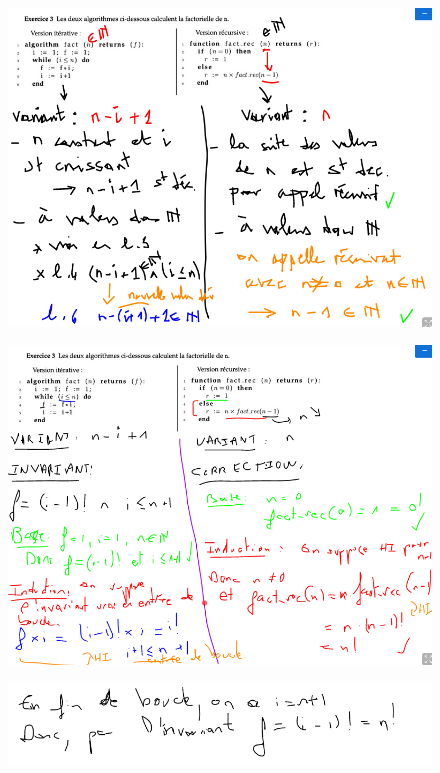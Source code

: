 \documentclass[a4paper]{article}
\begin{document}
\begin{figure}[!h]
  \centering
  \includegraphics[scale=0.65]{ex3_td5}
\end{figure}
\begin{figure}[!h]
  \centering
  \includegraphics[scale=0.65]{ex3bis_td5}
\end{figure}
\begin{figure}[!h]
  \centering
  \includegraphics[scale=0.65]{ex3ter_td5}
\end{figure}
\end{document}
